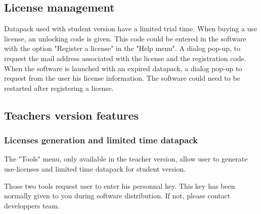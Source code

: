 \subsection{License management}
Datapack used with student version have a limited trial time. When buying a use license, an unlocking code is given. This code could be entered in the software with the option "Register a license" in the "Help menu". A dialog pop-up, to request the mail address associated with the license and the registration code.\\


When the software is launched with an expired datapack, a dialog pop-up to request from the user his license information. The software could need to be restarted after registering a license. 




\subsection{Teachers version features}
\subsubsection{Licenses generation and limited time datapack}

The "Tools" menu, only available in the teacher version, allow user to generate use-licenses and limited time datapack for student version. 

Those two tools request user to enter his personnal key. This key has been normally given to you during software distribution. If not, please contact developpers team.\\

